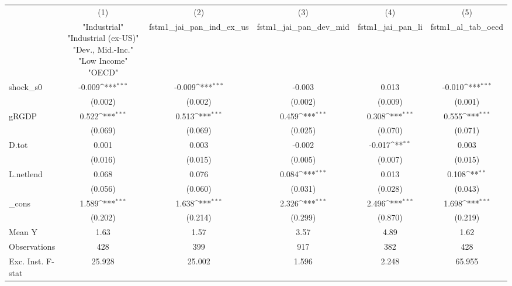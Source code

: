 {
\def\sym#1{\ifmmode^{#1}\else\(^{#1}\)\fi}
\begin{tabular}{l*{5}{c}}
\toprule
            &\multicolumn{1}{c}{(1)}&\multicolumn{1}{c}{(2)}&\multicolumn{1}{c}{(3)}&\multicolumn{1}{c}{(4)}&\multicolumn{1}{c}{(5)}\\
            &\multicolumn{1}{c}{ "Industrial" "Industrial (ex-US)" "Dev., Mid.-Inc." "Low Income" "OECD" }&\multicolumn{1}{c}{fstm1\_jai\_pan\_ind\_ex\_us}&\multicolumn{1}{c}{fstm1\_jai\_pan\_dev\_mid}&\multicolumn{1}{c}{fstm1\_jai\_pan\_li}&\multicolumn{1}{c}{fstm1\_al\_tab\_oecd}\\
\midrule
shock\_s0    &      -0.009\sym{***}&      -0.009\sym{***}&      -0.003         &       0.013         &      -0.010\sym{***}\\
            &     (0.002)         &     (0.002)         &     (0.002)         &     (0.009)         &     (0.001)         \\
\addlinespace
gRGDP       &       0.522\sym{***}&       0.513\sym{***}&       0.459\sym{***}&       0.308\sym{***}&       0.555\sym{***}\\
            &     (0.069)         &     (0.069)         &     (0.025)         &     (0.070)         &     (0.071)         \\
\addlinespace
D.tot       &       0.001         &       0.003         &      -0.002         &      -0.017\sym{**} &       0.003         \\
            &     (0.016)         &     (0.015)         &     (0.005)         &     (0.007)         &     (0.015)         \\
\addlinespace
L.netlend   &       0.068         &       0.076         &       0.084\sym{***}&       0.013         &       0.108\sym{**} \\
            &     (0.056)         &     (0.060)         &     (0.031)         &     (0.028)         &     (0.043)         \\
\addlinespace
\_cons      &       1.589\sym{***}&       1.638\sym{***}&       2.326\sym{***}&       2.496\sym{***}&       1.698\sym{***}\\
            &     (0.202)         &     (0.214)         &     (0.299)         &     (0.870)         &     (0.219)         \\
\midrule
Mean Y      &        1.63         &        1.57         &        3.57         &        4.89         &        1.62         \\
Observations&         428         &         399         &         917         &         382         &         428         \\
Exc. Inst. F-stat&      25.928         &      25.002         &       1.596         &       2.248         &      65.955         \\
\bottomrule
\end{tabular}
}
